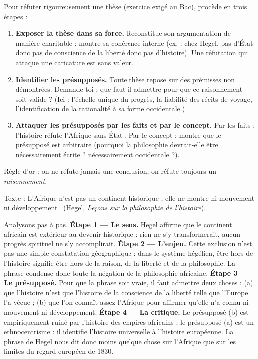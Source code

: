 \documentclass[11pt]{article}
\begin{document}
\begin{methode}
Pour réfuter rigoureusement une thèse (exercice exigé au Bac), procède en trois étapes :
\begin{enumerate}
\item \textbf{Exposer la thèse dans sa force.} Reconstitue son argumentation de manière charitable : montre sa cohérence interne (ex. : chez Hegel, pas d'État donc pas de conscience de la liberté donc pas d'histoire). Une réfutation qui attaque une caricature est sans valeur.
\item \textbf{Identifier les présupposés.} Toute thèse repose sur des prémisses non démontrées. Demande-toi : que faut-il admettre pour que ce raisonnement soit valide ? (Ici : l'échelle unique du progrès, la fiabilité des récits de voyage, l'identification de la rationalité à sa forme occidentale.)
\item \textbf{Attaquer les présupposés par les faits et par le concept.} Par les faits : l'histoire réfute l'Afrique \guillemotleft sans État \guillemotright. Par le concept : montre que le présupposé est arbitraire (pourquoi la philosophie devrait-elle être nécessairement écrite ? nécessairement occidentale ?).
\end{enumerate}
Règle d'or : on ne réfute jamais une conclusion, on réfute toujours un \emph{raisonnement}.
\end{methode}

\begin{experience}
Texte : \guillemotleft L'Afrique n'est pas un continent historique ; elle ne montre ni mouvement ni développement \guillemotright\ (Hegel, \emph{Leçons sur la philosophie de l'histoire}).

Analysons pas à pas. \textbf{Étape 1 — Le sens.} Hegel affirme que le continent africain est extérieur au devenir historique : rien ne s'y transformerait, aucun progrès spirituel ne s'y accomplirait. \textbf{Étape 2 — L'enjeu.} Cette exclusion n'est pas une simple constatation géographique : dans le système hégélien, être hors de l'histoire signifie être hors de la raison, de la liberté et de la philosophie. La phrase condense donc toute la négation de la philosophie africaine. \textbf{Étape 3 — Le présupposé.} Pour que la phrase soit vraie, il faut admettre deux choses : (a) que l'histoire n'est que l'histoire de la conscience de la liberté telle que l'Europe l'a vécue ; (b) que l'on connaît assez l'Afrique pour affirmer qu'elle n'a connu ni mouvement ni développement. \textbf{Étape 4 — La critique.} Le présupposé (b) est empiriquement ruiné par l'histoire des empires africains ; le présupposé (a) est un ethnocentrisme : il identifie l'histoire universelle à l'histoire européenne. La phrase de Hegel nous dit donc moins quelque chose sur l'Afrique que sur les limites du regard européen de 1830.
\end{experience}
\end{document}
